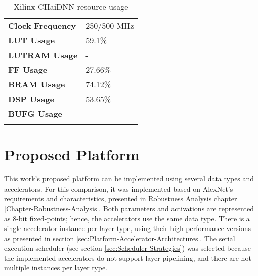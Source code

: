 \begin{table}[H]
	\caption{Xilinx CHaiDNN resource usage}
	\label{tab:CHaiDNN-resource-usage}
	\centering
	\begin{tabular}{ll}
		\toprule
		\textbf{Clock Frequency} & 250/500 MHz\\
		\textbf{LUT Usage} & 59.1\%\\
		\textbf{LUTRAM Usage} & -\\
		\textbf{FF Usage} & 27.66\%\\
		\textbf{BRAM Usage} & 74.12\%\\
		\textbf{DSP Usage} & 53.65\%\\
		\textbf{BUFG Usage} & -\\
		\bottomrule\\
	\end{tabular}
\end{table}



\section{Proposed Platform}
\label{sec:proposed-platform-implementation}
This work's proposed platform can be implemented using several data types and accelerators. For this comparison, it was implemented based on AlexNet's requirements and characteristics, presented in Robustness Analysis chapter \ref{Chapter-Robustness-Analysis}. Both parameters and activations are represented as 8-bit fixed-points; hence, the accelerators use the same data type. There is a single accelerator instance per layer type, using their high-performance versions as presented in section \ref{sec:Platform-Accelerator-Architectures}. The serial execution scheduler (see section \ref{sec:Scheduler-Strategies}) was selected because the implemented accelerators do not support layer pipelining, and there are not multiple instances per layer type.

